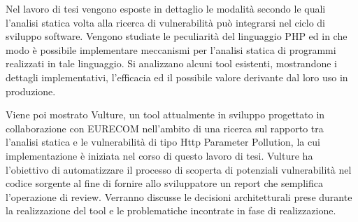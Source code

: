 Nel lavoro di tesi vengono esposte in dettaglio le modalità secondo le quali l'analisi statica volta alla ricerca di vulnerabilità può integrarsi nel ciclo di sviluppo software. Vengono studiate le peculiarità del linguaggio PHP ed in che modo è possibile implementare meccanismi per l'analisi statica di programmi realizzati in tale linguaggio. Si analizzano alcuni tool esistenti, mostrandone i dettagli implementativi, l'efficacia ed il possibile valore derivante dal loro uso in produzione.

Viene poi mostrato Vulture, un tool attualmente in sviluppo progettato in collaborazione con EURECOM nell'ambito di una ricerca sul rapporto tra l'analisi statica e le vulnerabilità di tipo Http Parameter Pollution, la cui implementazione è iniziata nel corso di questo lavoro di tesi. Vulture ha l'obiettivo di automatizzare il processo di scoperta di potenziali vulnerabilità nel codice sorgente al fine di fornire allo sviluppatore un report che semplifica l'operazione di review. Verranno discusse le decisioni architetturali prese durante la realizzazione del tool e le problematiche incontrate in fase di realizzazione.